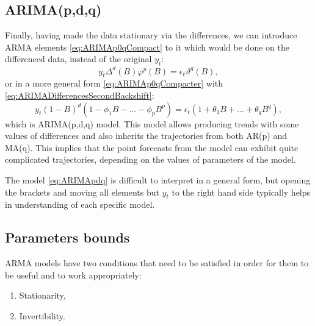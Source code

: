 \documentclass[
]{book}
\providecommand{\tightlist}{%
  \setlength{\itemsep}{0pt}\setlength{\parskip}{0pt}}
\theoremstyle{definition}
\theoremstyle{definition}
\theoremstyle{definition}
\theoremstyle{definition}
\theoremstyle{remark}
\begin{document}
\hypertarget{arimapdq}{%
\subsection{ARIMA(p,d,q)}\label{arimapdq}}

Finally, having made the data stationary via the differences, we can introduce ARMA elements \eqref{eq:ARIMAp0qCompact} to it which would be done on the differenced data, instead of the original \(y_t\):
\begin{equation}
  y_t \Delta^d(B) \varphi^p(B) = \epsilon_t \vartheta^q(B) ,
  \label{eq:ARIMApdqCompact}
\end{equation}
or in a more general form \eqref{eq:ARIMAp0qCompacter} with \eqref{eq:ARIMADifferencesSecondBackshift}:
\begin{equation}
  y_t (1-B)^d (1 - \phi_1 B - \dots - \phi_p B^p) = \epsilon_t (1 + \theta_1 B + \dots + \theta_q B^q),
  \label{eq:ARIMApdq}
\end{equation}
which is ARIMA(p,d,q) model. This model allows producing trends with some values of differences and also inherits the trajectories from both AR(p) and MA(q). This implies that the point forecasts from the model can exhibit quite complicated trajectories, depending on the values of parameters of the model.

The model \eqref{eq:ARIMApdq} is difficult to interpret in a general form, but opening the brackets and moving all elements but \(y_t\) to the right hand side typically helps in understanding of each specific model.

\hypertarget{ARIMABounds}{%
\subsection{Parameters bounds}\label{ARIMABounds}}

ARMA models have two conditions that need to be satisfied in order for them to be useful and to work appropriately:

\begin{enumerate}
\def\labelenumi{\arabic{enumi}.}
\tightlist
\item
  Stationarity,
\item
  Invertibility.
\end{enumerate}
\end{document}
